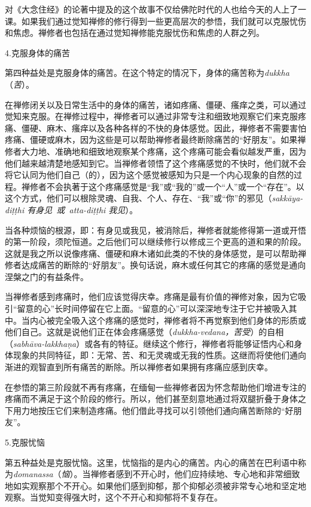 对《大念住经》的论著中提及的这个故事不仅给佛陀时代的人也给今天的人上了一课。如果我们通过觉知禅修的修行得到一些更高层次的参悟，我们就可以克服忧伤和焦虑。禅修者也包括在通过觉知禅修能克服忧伤和焦虑的人群之列。

\sssubsectnon 4.克服身体的痛苦

第四种益处是克服身体的痛苦。在这个特定的情况下，身体的痛苦称为{\it dukkha}（{\it 苦}）。

在禅修闭关以及日常生活中的身体的痛苦，诸如疼痛、僵硬、瘙痒之类，可以通过觉知来克服。在禅修过程中，禅修者可以通过非常专注和细致地观察它们来克服疼痛、僵硬、\1麻木、瘙痒以及各种各样的不快的身体感觉。因此，禅修者不需要害怕疼痛、僵硬或麻木，因为这些是可以帮助禅修者最终断除痛苦的“好朋友”。如果禅修者大力地、准确地和细致地观察某个疼痛，这个疼痛可能会看似越发严重，因为他们越来越清楚地感知到它。当禅修者领悟了这个疼痛感觉的不快时，他们就不会将它认同为他们自己（的），因为这个感觉被感知为只是一个内心现象的自然的过程。禅修者不会执著于这个疼痛感觉是“我”或“我的”或一个“人”或一个“存在”。以这个方式，他们可以根除灵魂、自我、个人、存在、“我”或“你”的邪见（{\it sakk\=aya-di\d t\d thi 有身见\ 或\ atta-di\d t\d thi 我见}）。

当各种烦恼的根源，即：有身见或我见，被消除后，禅修者就能修得第一道或开悟的第一阶段，须陀恒道。之后他们可以继续修行以修成三个更高的道和果的阶段。这就是我之所以说像疼痛、僵硬和麻木诸如此类的不快的身体感觉，是可以帮助禅修者达成痛苦的断除的“好朋友”。换句话说，麻木或任何其它的疼痛的感觉是通向涅槃之门的有益条件。

当禅修者感到疼痛时，他们应该觉得庆幸。疼痛是最有价值的禅修对象，因为它吸引“留意的心”长时间停留在它上面。“留意的心”可以深深地专注于它并被吸入其中。当内心被完全吸入这个疼痛的感觉时，禅修者将\1不再觉察到他们身体的形质或他们自己。这就是说他们正在体会疼痛感觉（{\it dukkha-vedana，苦受}）的自相（{\it sabh\=ava-lakkha\d na}）或各有的特征。继续这个修行，禅修者将能够证悟内心和身体现象的共同特征，即：无常、苦、和无灵魂或无我的性质。这继而将使他们通向渐进的观智直到所有痛苦的断除。所以禅修者如果拥有疼痛应感到庆幸。

在参悟的第三阶段就不再有疼痛，在缅甸一些禅修者因为怀念帮助他们增进专注的疼痛而不满足于这个阶段的修行。所以，他们甚至刻意地通过将双腿折叠于身体之下用力地按压它们来制造疼痛。他们借此寻找可以引领他们通向痛苦断除的“好朋友”。

\sssubsectnon 5.克服忧恼

第五种益处是克服忧恼。这里，忧恼指的是内心的痛苦。内心的痛苦在巴利语中称为{\it domanassa}（{\it 恼}）。当禅修者感到不开心时，他们应持续地、专心地和非常细致地如实观察那个不开心。如果他们感到抑郁，那个抑郁必须被非常专心地和坚定地观察。当觉知变得强大时，这个不开心和抑郁将不复存在。

